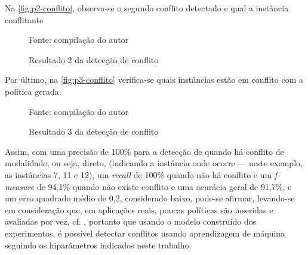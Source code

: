Na \autoref{fig:p2-conflito}, observa-se o segundo conflito detectado e qual a instância conflitante

\begin{figure}[H]
	\centering
	\caption{Resultado 2 da detecção de conflito}
	
	\label{fig:p2-conflito}
	{\scriptsize Fonte: compilação do autor}
\end{figure} 

Por último, na \autoref{fig:p3-conflito} verifica-se quais instâncias estão em conflito com a política gerada.

\begin{figure}[!h]
	\centering
	\caption{Resultado 3 da detecção de conflito}
	
	\label{fig:p3-conflito}
	{\scriptsize Fonte: compilação do autor}
\end{figure} 

Assim, com uma precisão de 100\% para a detecção de quando há conflito de modalidade, ou seja, direto, (indicando a instância onde ocorre --- neste exemplo, as instâncias 7, 11 e 12), um \textit{recall} de 100\% quando não há conflito e um \textit{f-measure} de 94,1\% quando não existe conflito e uma acurácia geral de 91,7\%, e um erro quadrado médio de 0,2, considerado baixo, pode-se afirmar, levando-se em consideração que, em aplicações reais, poucas políticas são inseridas e avaliadas por vez, cf. , portanto que usando o modelo construído dos experimentos, é possível detectar conflitos usando aprendizagem de máquina seguindo os hiparâmetros indicados neste trabalho.

